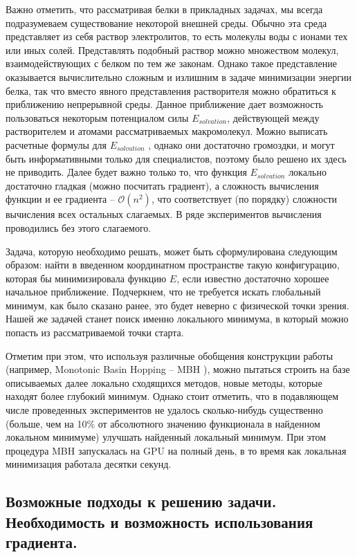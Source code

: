   Важно отметить, что рассматривая белки в прикладных задачах, мы всегда подразумеваем существование некоторой внешней среды.
  Обычно эта среда представляет из себя раствор электролитов, то есть молекулы воды с ионами тех или иных солей.
  Представлять подобный раствор можно множеством молекул, взаимодействующих с белком по тем же законам.
  Однако такое представление оказывается вычислительно сложным и излишним в задаче минимизации энергии белка, так что вместо явного представления растворителя можно обратиться к приближению непрерывной среды.
  Данное приближение дает возможность пользоваться некоторым потенциалом силы $E_{solvation}$, действующей между растворителем и атомами рассматриваемых макромолекул.
  Можно выписать расчетные формулы для $E_{solvation}$ \cite{still1990semianalytical}, однако они достаточно громоздки, и могут быть информативными только для специалистов, поэтому было решено их здесь не приводить.
  Далее будет важно только то, что функция $E_{solvation}$ локально достаточно гладкая (можно посчитать градиент), а сложность вычисления функции и ее градиента -- $\mathcal{O}\left( n^2 \right)$, что соответствует (по порядку) сложности вычисления всех остальных слагаемых.
  В ряде экспериментов вычисления проводились без этого слагаемого.

  Задача, которую необходимо решать, может быть сформулирована следующим образом: найти в введенном координатном пространстве такую конфигурацию, которая бы минимизировала функцию $E$, если известно достаточно хорошее начальное приближение. Подчеркнем, что не требуется искать глобальный минимум, как было сказано ранее, это будет неверно с физической точки зрения.
  Нашей же задачей станет поиск именно локального минимума, в который можно попасть из рассматриваемой точки старта.

  Отметим при этом, что используя различные обобщения конструкции работы \cite{wales1997global} (например, Monotonic Basin Hopping -- MBH \cite{posypkin2010}), можно пытаться строить на базе описываемых далее локально сходящихся методов, новые методы, которые находят более глубокий минимум.
  Однако стоит отметить, что в подавляющем числе проведенных экспериментов не удалось сколько-нибудь существенно (больше, чем на 10\% от абсолютного значению функционала в найденном локальном минимуме) улучшать найденный локальный минимум.
  При этом процедура MBH запускалась на GPU на полный день, в то время как локальная минимизация работала десятки секунд.

  \subsection{Возможные подходы к решению задачи. Необходимость и возможность использования градиента.}\label{subsec:sec1/su3}

